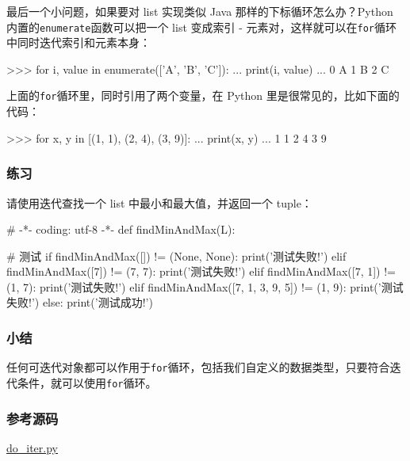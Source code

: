 最后一个小问题，如果要对 list 实现类似 Java 那样的下标循环怎么办？Python
内置的\texttt{enumerate}函数可以把一个 list 变成索引 -
元素对，这样就可以在\texttt{for}循环中同时迭代索引和元素本身：

\begin{pythoncode}
>>> for i, value in enumerate(['A', 'B', 'C']):
...     print(i, value)
...
0 A
1 B
2 C
\end{pythoncode}

上面的\texttt{for}循环里，同时引用了两个变量，在 Python
里是很常见的，比如下面的代码：

\begin{pythoncode}
>>> for x, y in [(1, 1), (2, 4), (3, 9)]:
...     print(x, y)
...
1 1
2 4
3 9
\end{pythoncode}

\hypertarget{ux7ec3ux4e60}{%
\subsubsection{练习}\label{ux7ec3ux4e60}}

请使用迭代查找一个 list 中最小和最大值，并返回一个 tuple：

\begin{pythoncode}
# -*- coding: utf-8 -*-
def findMinAndMax(L):
\end{pythoncode}

\begin{pythoncode}
# 测试
if findMinAndMax([]) != (None, None):
    print('测试失败!')
elif findMinAndMax([7]) != (7, 7):
    print('测试失败!')
elif findMinAndMax([7, 1]) != (1, 7):
    print('测试失败!')
elif findMinAndMax([7, 1, 3, 9, 5]) != (1, 9):
    print('测试失败!')
else:
    print('测试成功!')
\end{pythoncode}

\hypertarget{ux5c0fux7ed3}{%
\subsubsection{小结}\label{ux5c0fux7ed3}}

任何可迭代对象都可以作用于\texttt{for}循环，包括我们自定义的数据类型，只要符合迭代条件，就可以使用\texttt{for}循环。

\hypertarget{ux53c2ux8003ux6e90ux7801}{%
\subsubsection{参考源码}\label{ux53c2ux8003ux6e90ux7801}}

\href{https://github.com/michaelliao/learn-python3/blob/master/samples/advance/do_iter.py}{do\_iter.py}


